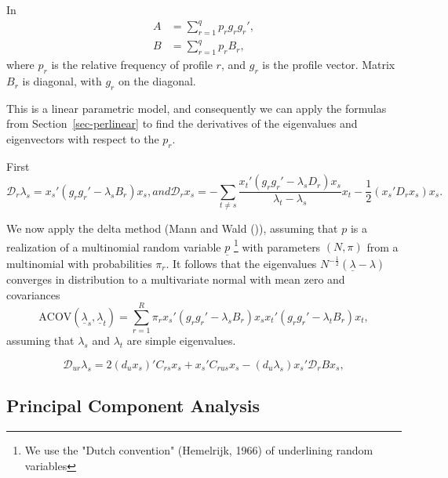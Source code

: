 \documentclass[
  12pt,
  letterpaper,
  DIV=11,
  numbers=noendperiod]{scrartcl}
\begin{document}
In \begin{subequations}
\begin{align}
A&=\sum_{r=1}^qp_rg_rg_r',\\
B&=\sum_{r=1}^qp_rB_r,
\end{align}
\end{subequations} where \(p_r\) is the relative frequency of profile
\(r\), and \(g_r\) is the profile vector. Matrix \(B_r\) is diagonal,
with \(g_r\) on the diagonal.

This is a linear parametric model, and consequently we can apply the
formulas from Section~\ref{sec-perlinear} to find the derivatives of the
eigenvalues and eigenvectors with respect to the \(p_r\).

First \begin{subequations}
\begin{equation}
\mathcal{D}_r\lambda_s=x_s'(g_rg_r'-\lambda_sB_r)x_s,\label{eq-linper1}
\end{equation}
and
\begin{equation}
\mathcal{D}_rx_s=-\sum_{t\not= s}\frac{x_t'(g_rg_r'-\lambda_sD_r)x_s}{\lambda_t-\lambda_s}x_t-\frac12(x_s'D_rx_s)x_s.\label{eq-linper2}
\end{equation}
\end{subequations}

We now apply the delta method (Mann and Wald
()), assuming that \(p\) is a
realization of a multinomial random variable \(\underline{p}\)
\footnote{We use the "Dutch convention" 
(Hemelrijk, 1966) of underlining random variables} with parameters
\((N,\pi)\) from a multinomial with probabilities \(\pi_r\). It follows
that the eigenvalues \(N^{-\frac12}(\underline{\lambda}-\lambda)\)
converges in distribution to a multivariate normal with mean zero and
covariances \[
\text{ACOV}(\underline{\lambda}_s, \underline{\lambda}_t)=\sum_{r=1}^R\pi_rx_s'(g_rg_r'-\lambda_sB_r)x_sx_t'(g_rg_r'-\lambda_tB_r)x_t,
\] assuming that \(\lambda_s\) and \(\lambda_t\) are simple eigenvalues.

\begin{equation}
\mathcal{D}_{ur}\lambda_s=2(d_ux_s)'C_{rs}x_s+
x_s'C_{rus}x_s-(d_u\lambda_s)x_s'\mathcal{D}_rBx_s,
\label{eq-hosanna}
\end{equation}

\subsection{Principal Component Analysis}\label{sec-pca}
\end{document}
